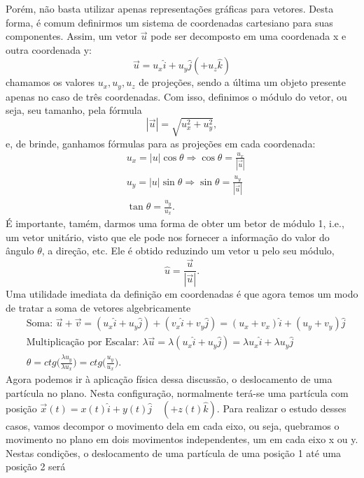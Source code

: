 \documentclass{article}
\begin{document}
 Por\'em, n\~ao basta utilizar apenas representa\c c\~oes gr\'aficas para vetores. Desta forma, \'e comum definirmos um sistema de coordenadas
cartesiano para suas componentes. Assim, um vetor $\vec{u}$ pode ser decomposto em uma coordenada x e outra coordenada y: 
  $$
  \vec{u} = u_{x}\hat{i} + u_{y}\hat{j} (+u_{z}\hat{k})
  $$
  chamamos os valores $u_{x}, u_{y}, u_{z}$ de proje\c c\~oes, sendo a \'ultima um objeto presente apenas no caso de tr\^es coordenadas.
Com isso, definimos o m\'odulo do vetor, ou seja, seu tamanho, pela f\'ormula 
  $$
    |\vec{u}| = \sqrt{u_{x}^{2}+u_{y}^{2}},
  $$
  e, de brinde, ganhamos f\'ormulas para as proje\c c\~oes em cada coordenada:
 \begin{align*}
   &u_{x} = |u|\cos{\theta} \Rightarrow \cos{\theta} = \frac{u_{x}}{|\vec{u}|}\\
   &u_{y} = |u|\sin{\theta} \Rightarrow \sin{\theta} = \frac{u_{y}}{|\vec{u}|}\\
   &\tan{\theta} = \frac{u_{y}}{u_{x}}.
 \end{align*}
 \'E importante, tam\'em, darmos uma forma de obter um betor de m\'odulo 1, i.e., um vetor unit\'ario, visto que ele pode nos fornecer a informa\c c\~ao do
valor do \^angulo $\theta$, a dire\c c\~ao, etc. Ele \'e obtido reduzindo um vetor u pelo seu m\'odulo, 
  $$
  \hat{u} = \frac{\vec{u}}{|\vec{u}|}.
  $$
  Uma utilidade imediata da defini\c c\~ao em coordenadas \'e que agora temos um modo de tratar a soma de vetores algebricamente 
    \begin{align*}
     &\text{Soma: } \vec{u}+\vec{v} = (u_{x}\hat{i} + u_{y}\hat{j}) + (v_{x}\hat{i} + v_{y}\hat{j}) = (u_{x}+v_{x})\hat{i} + (u_{y}+v_{y})\hat{j}\\
     &\text{Multiplica\c c\~ao por Escalar: } \lambda \vec{u} = \lambda(u_{x}\hat{i} + u_{y}\hat{j}) = \lambda u_{x}\hat{i} + \lambda u_{y}\hat{j}\\
     &\theta = ctg{\biggl(\frac{\lambda u_{y}}{\lambda u_{x}}\biggr) = ctg{\biggl(\frac{u_{y}}{u_{x}}\biggr)}}.
    \end{align*}
    Agora podemos ir \`a aplica\c c\~ao f\'isica dessa discuss\~ao, o deslocamento de uma part\'icula no plano. Nesta configura\c c\~ao, normalmente
  ter\'a-se uma part\'icula com posi\c c\~ao $\vec{x}(t) = x(t)\hat{i} + y(t)\hat{j}\quad (+z(t)\hat{k}).$ Para realizar o estudo desses casos,
  vamos decompor o movimento dela em cada eixo, ou seja, quebramos o movimento no plano em dois movimentos independentes, um em cada eixo
  x ou y. Nestas condi\c c\~oes, o deslocamento de uma part\'icula de uma posi\c c\~ao 1 at\'e uma posi\c c\~ao 2 ser\'a 
\end{document}
